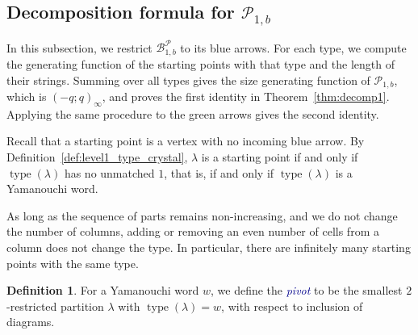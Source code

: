 \documentclass[11pt]{article}
\theoremstyle{definition}
\newtheorem{definition}[theorem]{Definition}
\theoremstyle{remark}
\theoremstyle{definition}
\numberwithin{equation}{section}
\newcommand{\type}{\operatorname{type}}
\renewcommand\emph[1]{\textcolor{darkblue}{\it #1}}
\begin{document}
\subsection{Decomposition formula for $\mathcal{P}_{1,b}$}\label{subsection:decomp1}

In this subsection, we restrict \(\mathcal{B}_{1,b}^{\mathcal{P}}\) to its blue arrows. For each type, we compute the generating function of the starting points with that type and the length of their strings. Summing over all types gives the size generating function of \(\mathcal{P}_{1,b}\), which is \((-q;q)_\infty\), and proves the first identity in Theorem~\ref{thm:decomp1}. Applying the same procedure to the green arrows gives the second identity.

Recall that a starting point is a vertex with no incoming blue arrow. By Definition~\ref{def:level1_type_crystal}, \( \lambda \) is a starting point if and only if \( \type(\lambda) \) has no unmatched \( 1 \), that is, if and only if \( \type(\lambda) \) is a Yamanouchi word.

As long as the sequence of parts remains non-increasing, and we do not change the number of columns, adding or removing an even number of cells from a column does not change the type. In particular, there are infinitely many starting points with the same type.

\begin{definition}\label{def:pivot_P1}
  For a Yamanouchi word \( w \), we define the \emph{pivot} to be the
  smallest $2$-restricted partition \( \lambda \) with \( \type(\lambda) = w \), with
  respect to inclusion of diagrams.
\end{definition}
\end{document}
